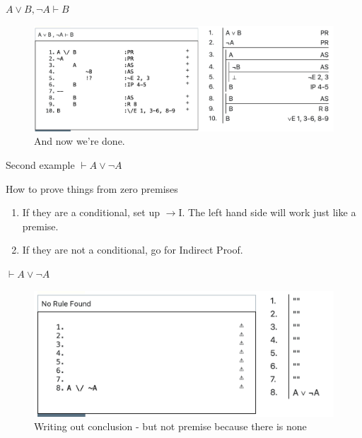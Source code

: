 \documentclass[
  ignorenonframetext,
]{beamer}
\providecommand{\tightlist}{%
  \setlength{\itemsep}{0pt}\setlength{\parskip}{0pt}}
\renewcommand{\,}{\text{, }}
\begin{document}
\begin{frame}{\(A \vee B, \neg A \vdash B\)}
\protect\hypertarget{a-vee-b-neg-a-vdash-b-8}{}
\begin{figure}
\centering
\includegraphics[width=\textwidth,height=0.75\textheight]{5_6h.png}
\caption{And now we're done.}
\end{figure}
\end{frame}

\begin{frame}{Second example}
\protect\hypertarget{second-example}{}
\(\vdash A \vee \neg A\)
\end{frame}

\begin{frame}{How to prove things from zero premises}
\protect\hypertarget{how-to-prove-things-from-zero-premises}{}
\begin{enumerate}
\tightlist
\item
  If they are a conditional, set up \(\rightarrow\)I. The left hand side
  will work just like a premise.
\item
  If they are not a conditional, go for Indirect Proof.
\end{enumerate}
\end{frame}

\begin{frame}{\(\vdash A \vee \neg A\)}
\protect\hypertarget{vdash-a-vee-neg-a}{}
\begin{figure}
\centering
\includegraphics[width=\textwidth,height=0.75\textheight]{5_6p.png}
\caption{Writing out conclusion - but not premise because there is none}
\end{figure}
\end{frame}
\end{document}
